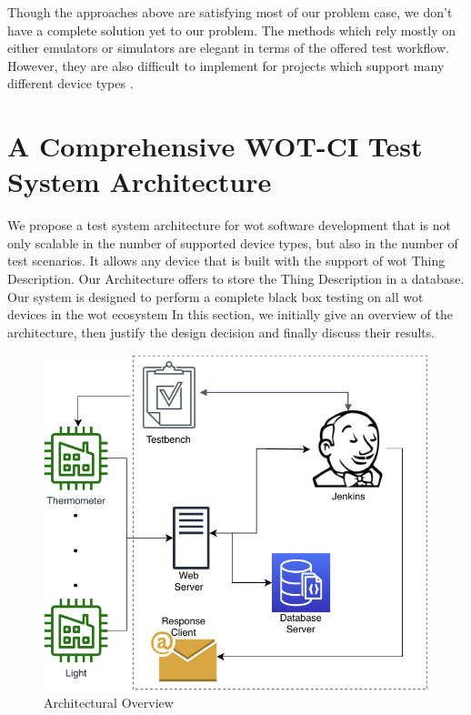 \documentclass[conference]{IEEEtran}
\theoremstyle{definition}
\begin{document}
Though the approaches above are satisfying most of our problem case, we don’t have a complete solution yet to our problem. 
The methods which rely mostly on either emulators or simulators are elegant in terms of the offered test workflow. 
However, they are also difficult to implement for projects which support many different device types \cite{rosenkranz2015distributed}.

\section{A Comprehensive WOT-CI Test System Architecture}

We propose a test system architecture for \ac{wot} software development that is not only scalable in the number of supported device types, but also in the number of test scenarios. 
It allows any device that is built with the support of \ac{wot} Thing Description. 
Our Architecture offers to store the Thing Description in a database. 
Our system is designed to perform a complete black box testing on all \ac{wot} devices in the \ac{wot} ecosystem
In this section, we initially give an overview of the architecture, then justify the design decision and finally discuss their results.

\begin{figure}[t]
  \centerline{\includegraphics[scale=0.6]{arch} }
  
  \caption{Architectural Overview}
  \label{fig:Architecture}
\end{figure}
\end{document}
